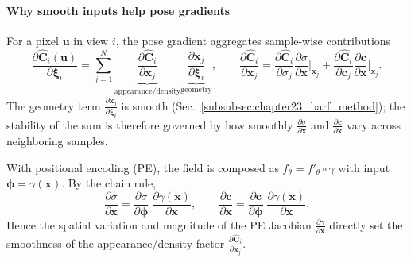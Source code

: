 \begin{enrichment}
\begin{enrichment}
        \paragraph{Why smooth inputs help pose gradients}
        For a pixel $\mathbf{u}$ in view $i$, the pose gradient aggregates sample-wise contributions
        \[
        \frac{\partial \widehat{\mathbf{C}}_i(\mathbf{u})}{\partial \boldsymbol{\xi}_i}
        =
        \sum_{j=1}^{N}
        \underbrace{\frac{\partial \widehat{\mathbf{C}}_i}{\partial \mathbf{x}_j}}_{\text{appearance/density}}
        \underbrace{\frac{\partial \mathbf{x}_j}{\partial \boldsymbol{\xi}_i}}_{\text{geometry}},
        \qquad
        \frac{\partial \widehat{\mathbf{C}}_i}{\partial \mathbf{x}_j}
        =
        \frac{\partial \widehat{\mathbf{C}}_i}{\partial \sigma_j}\frac{\partial \sigma}{\partial \mathbf{x}}\Big|_{\mathbf{x}_j}
        +
        \frac{\partial \widehat{\mathbf{C}}_i}{\partial \mathbf{c}_j}\frac{\partial \mathbf{c}}{\partial \mathbf{x}}\Big|_{\mathbf{x}_j}.
        \]
        The geometry term $\frac{\partial \mathbf{x}_j}{\partial \boldsymbol{\xi}_i}$ is smooth (Sec.~\ref{subsubsec:chapter23_barf_method}); the stability of the sum is therefore governed by how smoothly
        $\frac{\partial \sigma}{\partial \mathbf{x}}$ and $\frac{\partial \mathbf{c}}{\partial \mathbf{x}}$ vary across neighboring samples.
        
        With positional encoding (PE), the field is composed as $f_\theta = f'_\theta \circ \gamma$ with input
        $\boldsymbol{\phi}=\gamma(\mathbf{x})$. By the chain rule,
        \[
        \frac{\partial \sigma}{\partial \mathbf{x}}
        =
        \frac{\partial \sigma}{\partial \boldsymbol{\phi}}\;\frac{\partial \gamma(\mathbf{x})}{\partial \mathbf{x}},
        \qquad
        \frac{\partial \mathbf{c}}{\partial \mathbf{x}}
        =
        \frac{\partial \mathbf{c}}{\partial \boldsymbol{\phi}}\;\frac{\partial \gamma(\mathbf{x})}{\partial \mathbf{x}}.
        \]
        Hence the spatial variation and magnitude of the PE Jacobian $\frac{\partial \gamma}{\partial \mathbf{x}}$ directly set the smoothness of the appearance/density factor
        $\frac{\partial \widehat{\mathbf{C}}_i}{\partial \mathbf{x}_j}$.
        

\end{enrichment}
\end{enrichment}
